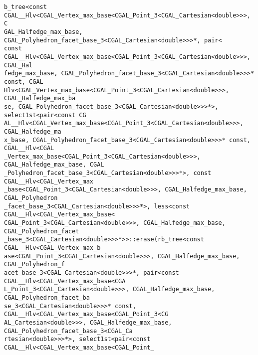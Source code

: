 \begin{titlepage}
\begin{lcTexBlock}
{\verb+b_tree<const CGAL__Hlv<CGAL_Vertex_max_base<CGAL_Point_3<CGAL_Cartesian<double>>>, C+\\
\verb+GAL_Halfedge_max_base, CGAL_Polyhedron_facet_base_3<CGAL_Cartesian<double>>>*, pair<+\\
\verb+const CGAL__Hlv<CGAL_Vertex_max_base<CGAL_Point_3<CGAL_Cartesian<double>>>, CGAL_Hal+\\
\verb+fedge_max_base, CGAL_Polyhedron_facet_base_3<CGAL_Cartesian<double>>>* const, CGAL__+\\
\verb+Hlv<CGAL_Vertex_max_base<CGAL_Point_3<CGAL_Cartesian<double>>>, CGAL_Halfedge_max_ba+\\
\verb+se, CGAL_Polyhedron_facet_base_3<CGAL_Cartesian<double>>>*>, select1st<pair<const CG+\\
\verb+AL__Hlv<CGAL_Vertex_max_base<CGAL_Point_3<CGAL_Cartesian<double>>>, CGAL_Halfedge_ma+\\
\verb+x_base, CGAL_Polyhedron_facet_base_3<CGAL_Cartesian<double>>>* const, CGAL__Hlv<CGAL+\\
\verb+_Vertex_max_base<CGAL_Point_3<CGAL_Cartesian<double>>>, CGAL_Halfedge_max_base, CGAL+\\
\verb+_Polyhedron_facet_base_3<CGAL_Cartesian<double>>>*>, const CGAL__Hlv<CGAL_Vertex_max+\\
\verb+_base<CGAL_Point_3<CGAL_Cartesian<double>>>, CGAL_Halfedge_max_base, CGAL_Polyhedron+\\
\verb+_facet_base_3<CGAL_Cartesian<double>>>*>, less<const CGAL__Hlv<CGAL_Vertex_max_base<+\\
\verb+CGAL_Point_3<CGAL_Cartesian<double>>>, CGAL_Halfedge_max_base, CGAL_Polyhedron_facet+\\
\verb+_base_3<CGAL_Cartesian<double>>>*>>::erase(rb_tree<const CGAL__Hlv<CGAL_Vertex_max_b+\\
\verb+ase<CGAL_Point_3<CGAL_Cartesian<double>>>, CGAL_Halfedge_max_base, CGAL_Polyhedron_f+\\
\verb+acet_base_3<CGAL_Cartesian<double>>>*, pair<const CGAL__Hlv<CGAL_Vertex_max_base<CGA+\\
\verb+L_Point_3<CGAL_Cartesian<double>>>, CGAL_Halfedge_max_base, CGAL_Polyhedron_facet_ba+\\
\verb+se_3<CGAL_Cartesian<double>>>* const, CGAL__Hlv<CGAL_Vertex_max_base<CGAL_Point_3<CG+\\
\verb+AL_Cartesian<double>>>, CGAL_Halfedge_max_base, CGAL_Polyhedron_facet_base_3<CGAL_Ca+\\
\verb+rtesian<double>>>*>, select1st<pair<const CGAL__Hlv<CGAL_Vertex_max_base<CGAL_Point_+\\
}
\end{lcTexBlock}
\end{titlepage}
